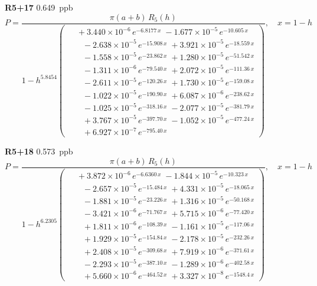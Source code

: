 \documentclass[12pt]{article}
\begin{document}
\noindent\textbf{R5+17} 0.649~ppb\nopagebreak
\begin{equation*}
P = \frac{\pi(a{+}b)\,R_5(h)}{1 - h^{5.8454}\!\left(\!\begin{aligned}
  &\; +3.440{\times}10^{-6}\,e^{-6.8177\,x} \; -1.677{\times}10^{-5}\,e^{-10.605\,x} \\[-3pt]
  &\quad -2.638{\times}10^{-5}\,e^{-15.908\,x} \; +3.921{\times}10^{-5}\,e^{-18.559\,x} \\[-3pt]
  &\quad -1.558{\times}10^{-5}\,e^{-23.862\,x} \; +1.280{\times}10^{-5}\,e^{-51.542\,x} \\[-3pt]
  &\quad -1.311{\times}10^{-6}\,e^{-79.540\,x} \; +2.072{\times}10^{-5}\,e^{-111.36\,x} \\[-3pt]
  &\quad -2.611{\times}10^{-5}\,e^{-120.26\,x} \; +1.730{\times}10^{-5}\,e^{-159.08\,x} \\[-3pt]
  &\quad -1.022{\times}10^{-5}\,e^{-190.90\,x} \; +6.087{\times}10^{-6}\,e^{-238.62\,x} \\[-3pt]
  &\quad -1.025{\times}10^{-5}\,e^{-318.16\,x} \; -2.077{\times}10^{-5}\,e^{-381.79\,x} \\[-3pt]
  &\quad +3.767{\times}10^{-5}\,e^{-397.70\,x} \; -1.052{\times}10^{-5}\,e^{-477.24\,x} \\[-3pt]
  &\quad +6.927{\times}10^{-7}\,e^{-795.40\,x}
\end{aligned}\!\right)}, \quad x = 1{-}h
\end{equation*}

\noindent\textbf{R5+18} 0.573~ppb\nopagebreak
\begin{equation*}
P = \frac{\pi(a{+}b)\,R_5(h)}{1 - h^{6.2305}\!\left(\!\begin{aligned}
  &\; +3.872{\times}10^{-6}\,e^{-6.6360\,x} \; -1.844{\times}10^{-5}\,e^{-10.323\,x} \\[-3pt]
  &\quad -2.657{\times}10^{-5}\,e^{-15.484\,x} \; +4.331{\times}10^{-5}\,e^{-18.065\,x} \\[-3pt]
  &\quad -1.881{\times}10^{-5}\,e^{-23.226\,x} \; +1.316{\times}10^{-5}\,e^{-50.168\,x} \\[-3pt]
  &\quad -3.421{\times}10^{-6}\,e^{-71.767\,x} \; +5.715{\times}10^{-6}\,e^{-77.420\,x} \\[-3pt]
  &\quad +1.811{\times}10^{-6}\,e^{-108.39\,x} \; -1.161{\times}10^{-5}\,e^{-117.06\,x} \\[-3pt]
  &\quad +1.929{\times}10^{-5}\,e^{-154.84\,x} \; -2.178{\times}10^{-5}\,e^{-232.26\,x} \\[-3pt]
  &\quad +2.408{\times}10^{-5}\,e^{-309.68\,x} \; +7.919{\times}10^{-6}\,e^{-371.61\,x} \\[-3pt]
  &\quad -2.293{\times}10^{-5}\,e^{-387.10\,x} \; -1.289{\times}10^{-6}\,e^{-402.58\,x} \\[-3pt]
  &\quad +5.660{\times}10^{-6}\,e^{-464.52\,x} \; +3.327{\times}10^{-8}\,e^{-1548.4\,x}
\end{aligned}\!\right)}, \quad x = 1{-}h
\end{equation*}
\end{document}
